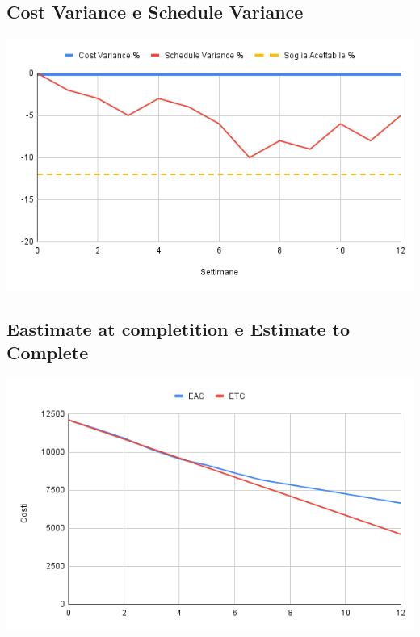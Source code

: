 \documentclass[a4paper, 12pt]{article}
\begin{document}
\subsection*{Cost Variance e Schedule Variance}
\begin{center}
	\includegraphics[scale=0.5]{Cost_Variance_Schedule_Variance.png}
\end{center}

\subsection*{Eastimate at completition e Estimate to Complete}
\begin{center}
	\includegraphics[scale=0.6]{EAC_ETC.png}
\end{center}
\end{document}

